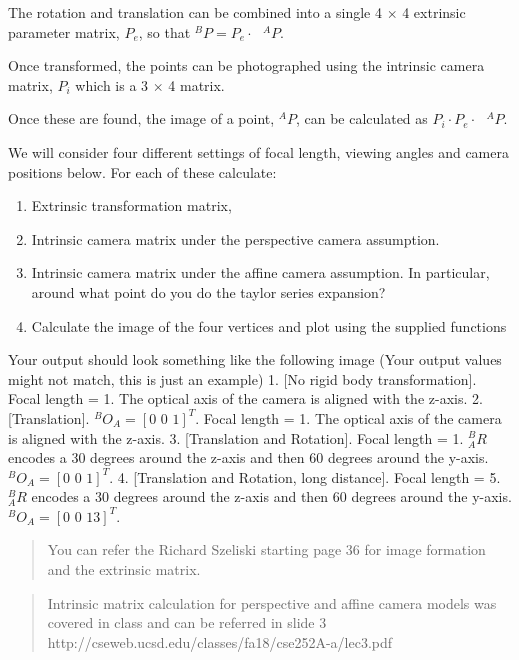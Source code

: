 \documentclass[11pt]{article}
\begin{document}
The rotation and translation can be combined into a single 4 \(\times\)
4 extrinsic parameter matrix, \(P_e\), so that
\(^BP = P_e \cdot \text{ }^AP\).

Once transformed, the points can be photographed using the intrinsic
camera matrix, \(P_i\) which is a 3 \(\times\) 4 matrix.

Once these are found, the image of a point, \(^AP\), can be calculated
as \(P_i \cdot P_e \cdot \text{ }^AP\).

We will consider four different settings of focal length, viewing angles
and camera positions below. For each of these calculate:

\begin{enumerate}
\def\labelenumi{\alph{enumi})}
\item
  Extrinsic transformation matrix,
\item
  Intrinsic camera matrix under the perspective camera assumption.
\item
  Intrinsic camera matrix under the affine camera assumption. In
  particular, around what point do you do the taylor series expansion?
\item
  Calculate the image of the four vertices and plot using the supplied
  functions
\end{enumerate}

Your output should look something like the following image (Your output
values might not match, this is just an example) 1. {[}No rigid body
transformation{]}. Focal length = 1. The optical axis of the camera is
aligned with the z-axis. 2. {[}Translation{]}.
\(^BO_A = [\text{0 0 1}]^T\). Focal length = 1. The optical axis of the
camera is aligned with the z-axis. 3. {[}Translation and Rotation{]}.
Focal length = 1. \(^B_AR\) encodes a 30 degrees around the z-axis and
then 60 degrees around the y-axis. \(^BO_A = [\text{0 0 1}]^T\). 4.
{[}Translation and Rotation, long distance{]}. Focal length = 5.
\(^B_AR\) encodes a 30 degrees around the z-axis and then 60 degrees
around the y-axis. \(^BO_A = [\text{0 0 13}]^T\).

\begin{quote}
You can refer the Richard Szeliski starting page 36 for image formation
and the extrinsic matrix.
\end{quote}

\begin{quote}
Intrinsic matrix calculation for perspective and affine camera models
was covered in class and can be referred in slide 3
http://cseweb.ucsd.edu/classes/fa18/cse252A-a/lec3.pdf
\end{quote}
\end{document}
